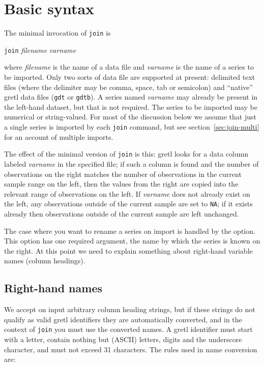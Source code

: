 \section{Basic syntax}
\label{sec:join-syntax}

The minimal invocation of \texttt{join} is

\qquad \texttt{join} \textsl{filename} \textsl{varname}

where \textsl{filename} is the name of a data file and
\textsl{varname} is the name of a series to be imported. Only two
sorts of data file are supported at present: delimited text files
(where the delimiter may be comma, space, tab or semicolon) and
``native'' gretl data files (\texttt{gdt} or \texttt{gdtb}).  A series
named \textsl{varname} may already be present in the left-hand
dataset, but that is not required. The series to be imported may be
numerical or string-valued. For most of the discussion below we assume
that just a single series is imported by each \texttt{join} command,
but see section~\ref{sec:join-multi} for an account of multiple
imports.

The effect of the minimal version of \texttt{join} is this: gretl
looks for a data column labeled \textsl{varname} in the specified
file; if such a column is found and the number of observations on the
right matches the number of observations in the current sample range
on the left, then the values from the right are copied into the
relevant range of observations on the left. If \textsl{varname} does
not already exist on the left, any observations outside of the current
sample are set to \texttt{NA}; if it exists already then observations
outside of the current sample are left unchanged.

The case where you want to rename a series on import is handled by the
 option. This option has one required argument, the name
by which the series is known on the right. At this point we need to
explain something about right-hand variable names (column
headings). 

\subsection{Right-hand names}
\label{subsec:rhnames}

We accept on input arbitrary column heading strings, but if these
strings do not qualify as valid gretl identifiers they are
automatically converted, and in the context of \texttt{join} you must
use the converted names. A gretl identifier must start with a letter,
contain nothing but (ASCII) letters, digits and the underscore
character, and must not exceed 31 characters. The rules used in name
conversion are:

